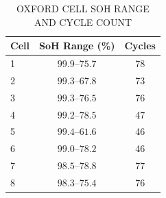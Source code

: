 \begin{table}[H]
    \caption{OXFORD CELL SOH RANGE AND CYCLE COUNT}
    \label{tab:oxford_soh_summary}
    \begin{center}
        \footnotesize
        \begin{tabular}{lcc}
            \hline
            \textbf{Cell} & \textbf{SoH Range (\%)} & \textbf{Cycles} \\
            \hline
            1 & $99.9$--$75.7$ & 78 \\
            2 & $99.3$--$67.8$ & 73 \\
            3 & $99.3$--$76.5$ & 76 \\
            4 & $99.2$--$78.5$ & 47 \\
            5 & $99.4$--$61.6$ & 46 \\
            6 & $99.0$--$78.2$ & 46 \\
            7 & $98.5$--$78.8$ & 77 \\
            8 & $98.3$--$75.4$ & 76 \\
            \hline
        \end{tabular}
    \end{center}
\end{table}
